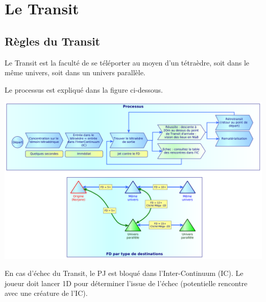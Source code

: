 \documentclass[11pt]{article}
\begin{document}
\newpage
\section{Le Transit}

\subsection{Règles du Transit}

Le Transit est la faculté de se téléporter au moyen d'un tétraèdre, soit dans le même univers, soit dans un univers parallèle.

Le processus est expliqué dans la figure ci-dessous.

\begin{center}
\includegraphics[scale=0.21]{04-transit}
\end{center}

En cas d'échec du Transit, le PJ est bloqué dans l'Inter-Continuum (IC). Le joueur doit lancer 1D pour déterminer l'issue de l'échec (potentielle rencontre avec une créature de l'IC).
\end{document}

